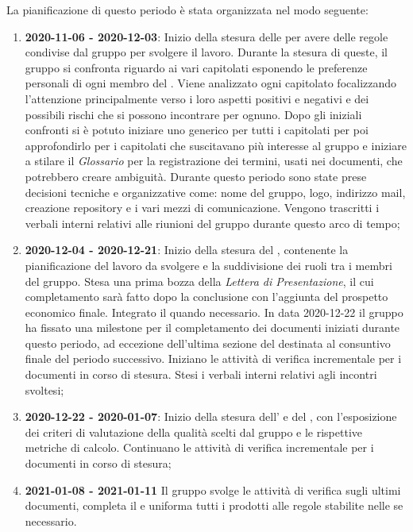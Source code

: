 La pianificazione di questo periodo è stata organizzata nel modo seguente:
\begin{enumerate}
\item \textbf{2020-11-06 - 2020-12-03}:
Inizio della stesura delle \textit{\NdP} per avere delle regole condivise dal gruppo per svolgere il lavoro. Durante la stesura di queste, il gruppo si confronta riguardo ai vari capitolati esponendo le preferenze personali di ogni membro del . Viene analizzato ogni capitolato focalizzando l'attenzione principalmente verso i loro aspetti positivi e negativi e dei possibili rischi che si possono incontrare per ognuno. Dopo gli iniziali confronti si è potuto iniziare uno \textit{\SdF} generico per tutti i capitolati per poi approfondirlo per i capitolati che suscitavano più interesse al gruppo e iniziare a stilare il \textit{Glossario} per la registrazione dei termini, usati nei documenti, che potrebbero creare ambiguità. Durante questo periodo sono state prese decisioni tecniche e organizzative come: nome del gruppo, logo, indirizzo mail, creazione repository e i vari mezzi di comunicazione. Vengono trascritti i verbali interni relativi alle riunioni del gruppo durante questo arco di tempo;
\item \textbf{2020-12-04 - 2020-12-21}:
Inizio della stesura del \textit{\PdP}, contenente la pianificazione del lavoro da svolgere e la suddivisione dei ruoli tra i membri del gruppo. Stesa una prima bozza della \textit{Lettera di Presentazione}, il cui completamento sarà fatto dopo la conclusione \textit{\PdP} con l'aggiunta del prospetto economico finale. Integrato il \textit{\Glossario} quando necessario. In data 2020-12-22 il gruppo ha fissato una milestone per il completamento dei documenti iniziati durante questo periodo, ad eccezione dell'ultima sezione del \textit{\PdP} destinata al consuntivo finale del periodo successivo. Iniziano le attività di verifica incrementale per i documenti in corso di stesura. Stesi i verbali interni relativi agli incontri svoltesi;
\item \textbf{2020-12-22 - 2020-01-07}:
    Inizio della stesura dell'\textit{\AdR} e del \textit{\PdQ}, con l'esposizione dei criteri di valutazione della qualità scelti dal gruppo e le rispettive metriche di calcolo. Continuano le attività di verifica incrementale per i documenti in corso di stesura;
\item \textbf{2021-01-08 - 2021-01-11}
    Il gruppo svolge le attività di verifica sugli ultimi documenti, completa il \textit{\Glossario} e uniforma tutti i prodotti alle regole stabilite nelle \textit{\NdP} se necessario.
\end{enumerate}

